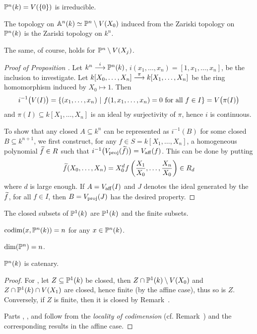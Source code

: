 \documentclass[a4paper,parskip=half,numbers=enddot, DIV=12]{scrreprt}
\begin{document}
\begin{cor*}
$\mathbb{P}^n(k) = V(\{0\})$ is irreducible.
\end{cor*}
\begin{prop}
The topology on $\mathbb{A}^n(k) \simeq \mathbb{P}^n\setminus V(X_0)$ induced from the Zariski topology on $\mathbb{P}^n(k)$ is the Zariski topology on $k^n$.
\end{prop}
\begin{rem*}
The same, of course, holds for $\mathbb{P}^n\setminus V(X_j)$.
\end{rem*}
\begin{proof}[Proof of Proposition ]
Let $k^n\morphism[i]\IP^n(k)$, $i(x_1,\ldots,x_n) = [1,x_1,\ldots,x_n]$, be the inclusion to investigate. Let $k[X_0,\ldots,X_n]\morphism[\pi]k[X_1,\ldots,X_n]$ be the ring homomorphism induced by $X_0\mapsto 1$. Then 
\begin{align*}
	i^{-1}\big(V(I)\big)=\left\{(x_1,\ldots,x_n) \ \middle|\  f(1,x_1,\ldots,x_n) = 0\text{ for all }f\in I\right\}=V\big(\pi(I)\big)
\end{align*}
and $\pi(I)\subseteq k[X_1,\ldots,X_n]$ is an ideal by surjectivity of $\pi$, hence $i$ is continuous.

To show that any closed $A\subseteq k^n$ can be represented as $i^{-1}(B)$ for some closed $B\subseteq k^{n+1}$, we first construct,
for any $f\in S = k[X_1,\ldots,X_n]$, a homogeneous polynomial $\snake f\in R$ such that $i^{-1}\big(V_\proj(\snake f)\big) = V_\aff(f)$.
This can be done by putting \begin{align*}
\snake f (X_0,\ldots,X_n)  = X_0^d f\left(\frac{X_1}{X_0},\ldots,\frac{X_n}{X_0}\right) \in R_d
\end{align*}
where $d$ is large enough. If $A = V_{\mathrm{aff}}(I)$ and $J$ denotes the ideal generated by the $\snake f$, for all $f\in I$,
then $B = V_{\mathrm{proj}}(J)$ has the desired property.
\end{proof}
\begin{cor}
\begin{alphanumerate}
\item The closed subsets of $\mathbb{P}^1(k)$ are $\mathbb{P}^1(k)$ and the finite subsets.
\item $\operatorname{codim}(x,\mathbb{P}^n(k)) = n$ for any $x\in \mathbb{P}^n(k)$.
\item $\dim(\mathbb{P}^n)=n$.
\item $\mathbb{P}^n(k)$ is catenary.
\end{alphanumerate}
\end{cor}
\begin{proof}
	For , let $Z\subseteq\mathbb{P}^1(k)$ be closed, then $Z\cap\mathbb{P}^1(k)\setminus V(X_0)$ and $Z\cap \mathbb{P}^1(k)\cap V(X_1)$ are closed, hence finite (by the affine case), thus so is $Z$. Conversely, if $Z$ is finite, then it is closed by Remark~.
	
	Parts , , and  follow from the \emph{locality of codimension} (cf. Remark~) and the corresponding results in the affine case.
\end{proof}
\end{document}
